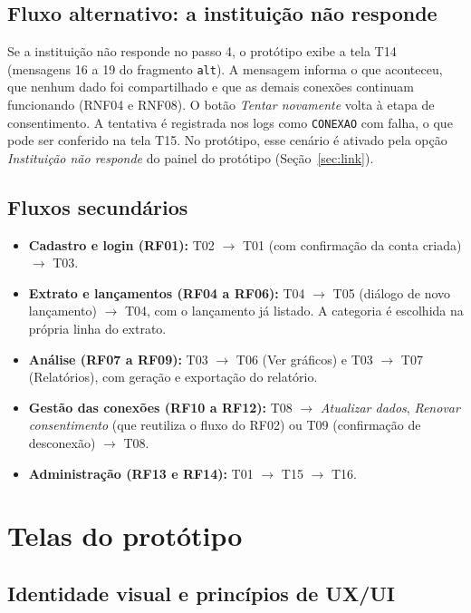 \documentclass[11pt,a4paper]{article}
\newcommand{\cls}[1]{\texttt{#1}}
\begin{document}
\subsection{Fluxo alternativo: a instituição não responde}

Se a instituição não responde no passo 4, o protótipo exibe a tela T14 (mensagens 16 a 19 do fragmento \cls{alt}). A mensagem informa o que aconteceu, que nenhum dado foi compartilhado e que as demais conexões continuam funcionando (RNF04 e RNF08). O botão \emph{Tentar novamente} volta à etapa de consentimento. A tentativa é registrada nos logs como \cls{CONEXAO} com falha, o que pode ser conferido na tela T15. No protótipo, esse cenário é ativado pela opção \emph{Instituição não responde} do painel do protótipo (Seção~\ref{sec:link}).

\subsection{Fluxos secundários}

\begin{itemize}
\item \textbf{Cadastro e login (RF01):} T02 $\rightarrow$ T01 (com confirmação da conta criada) $\rightarrow$ T03.
\item \textbf{Extrato e lançamentos (RF04 a RF06):} T04 $\rightarrow$ T05 (diálogo de novo lançamento) $\rightarrow$ T04, com o lançamento já listado. A categoria é escolhida na própria linha do extrato.
\item \textbf{Análise (RF07 a RF09):} T03 $\rightarrow$ T06 (Ver gráficos) e T03 $\rightarrow$ T07 (Relatórios), com geração e exportação do relatório.
\item \textbf{Gestão das conexões (RF10 a RF12):} T08 $\rightarrow$ \emph{Atualizar dados}, \emph{Renovar consentimento} (que reutiliza o fluxo do RF02) ou T09 (confirmação de desconexão) $\rightarrow$ T08.
\item \textbf{Administração (RF13 e RF14):} T01 $\rightarrow$ T15 $\rightarrow$ T16.
\end{itemize}

\section{Telas do protótipo}

\subsection{Identidade visual e princípios de UX/UI}
\end{document}
